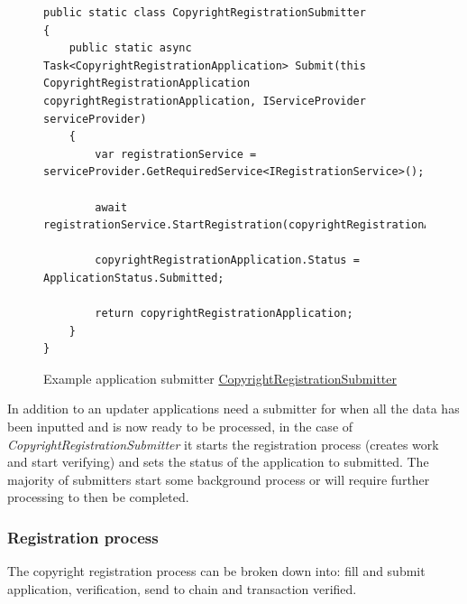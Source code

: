 \begin{figure}[H]
\caption{Example application submitter \href{https://github.com/MrHarrisonBarker/CRPL/blob/main/CRPL.Web/Core/Applications/Submitters/CopyrightRegistrationSubmitter.cs}{CopyrightRegistrationSubmitter}}
\centering
\begin{lstlisting}[language=CSharp]
public static class CopyrightRegistrationSubmitter
{
    public static async Task<CopyrightRegistrationApplication> Submit(this CopyrightRegistrationApplication copyrightRegistrationApplication, IServiceProvider serviceProvider)
    {
        var registrationService = serviceProvider.GetRequiredService<IRegistrationService>();
        
        await registrationService.StartRegistration(copyrightRegistrationApplication);

        copyrightRegistrationApplication.Status = ApplicationStatus.Submitted;
        
        return copyrightRegistrationApplication;
    }
}
\end{lstlisting}
\end{figure}

In addition to an updater applications need a submitter for when all the data has been inputted and is now ready to be processed, in the case of \textit{CopyrightRegistrationSubmitter} it starts the registration process (creates work and start verifying) and sets the status of the application to submitted. The majority of submitters start some background process or will require further processing to then be completed.

\subsubsection{Registration process}

The copyright registration process can be broken down into: fill and submit application, verification, send to chain and transaction verified.


